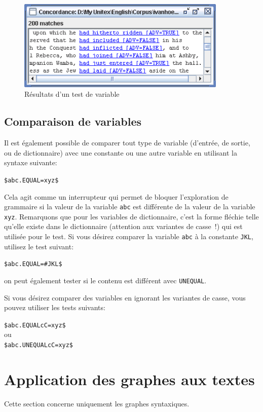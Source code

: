 \begin{figure}[!ht]
\begin{center}
\includegraphics[width=10cm]{resources/img/fig6-29c.png}
\caption{Résultats d'un test de variable\label{fig-testing-a-variable-results}}
\end{center}
\end{figure}


\subsection{Comparaison de variables}
Il est également possible de comparer tout type de variable (d'entrée, de sortie, ou de dictionnaire) avec une constante ou une autre variable en utilisant la syntaxe suivante:


\bigskip
\noindent \verb+$abc.EQUAL=xyz$+

\bigskip
\noindent Cela agit comme un interrupteur qui permet de bloquer l'exploration de grammaire si la valeur de la variable \verb+abc+ est différente de la valeur de la variable \verb+xyz+. Remarquons que pour les variables de dictionnaire, c'est la forme fléchie telle qu'elle existe dans le dictionnaire (attention aux variantes de casse~!) qui est utilisée pour le test. Si vous désirez comparer la variable \verb+abc+ à la constante \verb+JKL+, utilisez le test suivant:

\bigskip
\noindent \verb+$abc.EQUAL=#JKL$+

\bigskip
\noindent on peut également tester si le contenu est différent avec \verb+UNEQUAL+.

\bigskip
\noindent Si vous désirez comparer des variables en ignorant les variantes de casse, vous pouvez
utiliser les tests suivants:

\bigskip
\noindent \verb+$abc.EQUALcC=xyz$+ \\
ou \\
\verb+$abc.UNEQUALcC=xyz$+


\section{Application des graphes aux textes}
\label{section-applying-graphs-to-text}
Cette section concerne uniquement les graphes syntaxiques.
